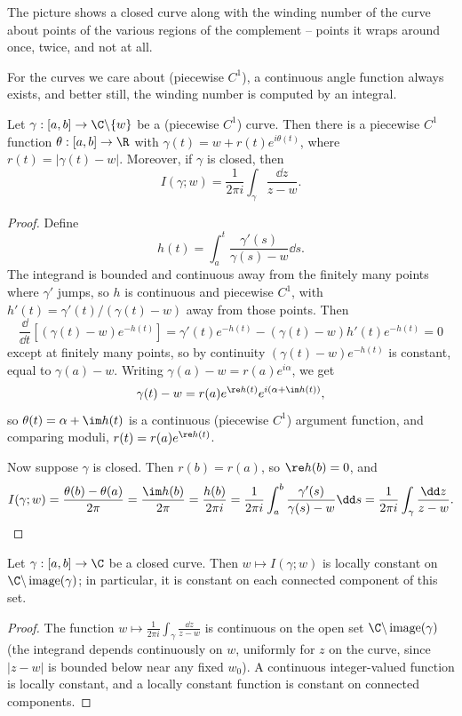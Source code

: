 The picture shows a closed curve along with the winding number of the curve about points of the various regions of the complement -- points it wraps around once, twice, and not at all.

For the curves we care about (piecewise $C^1$), a continuous angle function always exists, and better still, the winding number is computed by an integral.

\begin{lemma}
    Let $\gamma: [a, b] \rightarrow \C \backslash \{w\}$ be a (piecewise $C^1$) curve. Then there is a piecewise $C^1$ function $\theta: [a, b] \rightarrow \R$ with $\gamma(t) = w + r(t)e^{i \theta(t)}$, where $r(t) = |\gamma(t) - w|$. Moreover, if $\gamma$ is closed, then
    $$
    I(\gamma; w) = \frac{1}{2 \pi i} \int_\gamma \frac{\dd z}{z - w}.
    $$
\end{lemma}
\begin{proof}
    Define
    $$
    h(t) = \int_a^t \frac{\gamma'(s)}{\gamma(s) - w} \dd s.
    $$
    The integrand is bounded and continuous away from the finitely many points where $\gamma'$ jumps, so $h$ is continuous and piecewise $C^1$, with $h'(t) = \gamma'(t)/(\gamma(t) - w)$ away from those points. Then
    $$
    \frac{\dd}{\dd t}\left[(\gamma(t) - w)e^{-h(t)}\right] = \gamma'(t)e^{-h(t)} - (\gamma(t) - w)h'(t)e^{-h(t)} = 0
    $$
    except at finitely many points, so by continuity $(\gamma(t) - w)e^{-h(t)}$ is constant, equal to $\gamma(a) - w$. Writing $\gamma(a) - w = r(a)e^{i \alpha}$, we get
    $$
    \gamma(t) - w = r(a)e^{\re h(t)}e^{i(\alpha + \im h(t))},
    $$
    so $\theta(t) = \alpha + \im h(t)$ is a continuous (piecewise $C^1$) argument function, and comparing moduli, $r(t) = r(a)e^{\re h(t)}$.

    Now suppose $\gamma$ is closed. Then $r(b) = r(a)$, so $\re h(b) = 0$, and
    \[
    I(\gamma; w) = \frac{\theta(b) - \theta(a)}{2 \pi} = \frac{\im h(b)}{2 \pi} = \frac{h(b)}{2 \pi i} = \frac{1}{2 \pi i}\int_a^b \frac{\gamma'(s)}{\gamma(s) - w} \dd s = \frac{1}{2 \pi i}\int_\gamma \frac{\dd z}{z - w}.
    \]
\end{proof}

\begin{proposition}
    Let $\gamma: [a, b] \rightarrow \C$ be a closed curve. Then $w \mapsto I(\gamma; w)$ is locally constant on $\C \backslash \operatorname{image}(\gamma)$; in particular, it is constant on each connected component of this set.
\end{proposition}
\begin{proof}
    The function $w \mapsto \frac{1}{2 \pi i}\int_\gamma \frac{\dd z}{z - w}$ is continuous on the open set $\C \backslash \operatorname{image}(\gamma)$ (the integrand depends continuously on $w$, uniformly for $z$ on the curve, since $|z - w|$ is bounded below near any fixed $w_0$). A continuous integer-valued function is locally constant, and a locally constant function is constant on connected components.
\end{proof}

